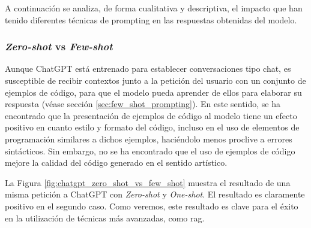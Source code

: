A continuación se analiza, de forma cualitativa y descriptiva, el impacto que han tenido diferentes técnicas de {prompting} en las respuestas obtenidas del modelo.

\subsubsection{\emph{Zero-shot} vs \emph{Few-shot}}

Aunque ChatGPT está entrenado para establecer conversaciones tipo chat, es susceptible de recibir contextos junto a la petición del usuario con un conjunto de ejemplos de código, para que el modelo pueda aprender de ellos para elaborar su respuesta (véase sección \ref{sec:few_shot_prompting}). En este sentido, se ha encontrado que la presentación de ejemplos de código al modelo tiene un efecto positivo en cuanto estilo y formato del código, incluso en el uso de elementos de programación similares a dichos ejemplos, haciéndolo menos proclive a errores sintácticos. Sin embargo, no se ha encontrado que el uso de ejemplos de código mejore la calidad del código generado en el sentido artístico. 

La Figura \ref{fig:chatgpt_zero_shot_vs_few_shot} muestra el resultado de una misma petición a ChatGPT con \emph{Zero-shot} y \emph{One-shot}. El resultado es claramente positivo en el segundo caso. Como veremos, este resultado es clave para el éxito en la utilización de técnicas más avanzadas, como \gls{rag}.


